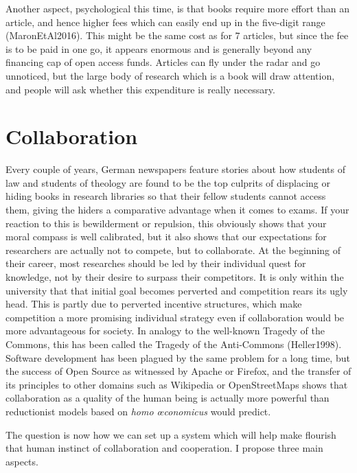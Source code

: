 \documentclass[12pt]{article}
\newcommand{\citep}[1]{(#1)}
\begin{document}
 Another aspect, psychological this time, is that books require more effort than an article, and hence higher fees which can easily end up in the five-digit range \citep{MaronEtAl2016}. This might be the same cost as for 7 articles, but since the fee is to be paid in one go, it appears enormous and is generally beyond any financing cap of open access funds. Articles can fly under the radar and go unnoticed, but the large body of research which is a book will draw attention, and people will ask whether this expenditure is really necessary. 
 
\section{Collaboration}
Every couple of years, German newspapers feature stories about how students of law and students of theology are found to be the top culprits of displacing or hiding books in research libraries so that their fellow students cannot access them, giving the hiders a comparative advantage when it comes to exams. If your reaction to this is bewilderment or repulsion, this obviously shows that your moral compass is well calibrated, but it also shows that our expectations for researchers are actually not to compete, but to collaborate. At the beginning of their career, most researches should be led by their individual quest for knowledge, not by their desire to surpass their competitors. It is only within the university that that initial goal becomes perverted and competition rears its ugly head. This is partly due to perverted incentive structures, which make competition a more promising individual strategy even if collaboration would be more advantageous for society. In analogy to the well-known Tragedy of the Commons, this has been called the Tragedy of the Anti-Commons \citep{Heller1998}. Software development has been plagued by the same problem for a long time,  but the success of Open Source as witnessed by Apache or Firefox, and the transfer of its principles to other domains such as Wikipedia or OpenStreetMaps shows that collaboration as a quality of the human being is actually more powerful than reductionist models based on \textit{homo œconomicus} would predict.

The question is now how we can set up a system which will help make flourish that human instinct of collaboration and cooperation. 
I propose three main aspects.
\end{document}
